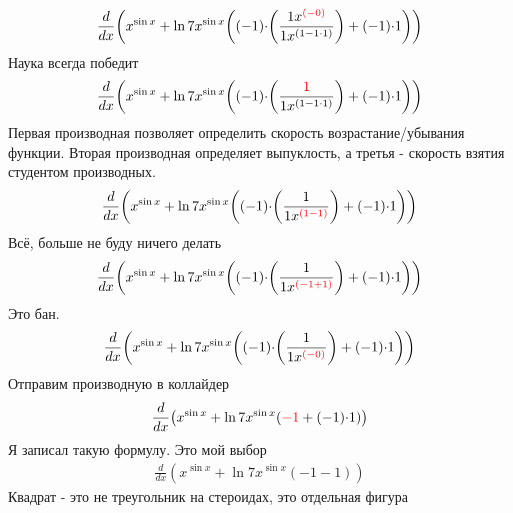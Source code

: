 \documentclass{article}
\begin{document}
\begin{center}
\begin{gather*}
{{\frac{{d}}{{d{{x}}}}}{{\left({{x}^{\sin{{x}}}}+{{\ln{{7}}}{{{x}^{\sin{{x}}}}{\left({{\left(-{1}\right)}{\cdot}{\left(\frac{{{1}{{x}^{\color{red}{{\left(-{0}\right)}}}}}}{{{1}{{x}^{\left({1}-{{1}{\cdot}{1}}\right)}}}}\right)}}+{{\left(-{1}\right)}{\cdot}{1}}\right)}}}\right)}}}\end{gather*}
Наука всегда победит\begin{gather*}
{{\frac{{d}}{{d{{x}}}}}{{\left({{x}^{\sin{{x}}}}+{{\ln{{7}}}{{{x}^{\sin{{x}}}}{\left({{\left(-{1}\right)}{\cdot}{\left(\frac{{\color{red}{{1}}}}{{{1}{{x}^{\left({1}-{{1}{\cdot}{1}}\right)}}}}\right)}}+{{\left(-{1}\right)}{\cdot}{1}}\right)}}}\right)}}}\end{gather*}
Первая производная позволяет определить скорость возрастание/убывания функции. Вторая производная определяет выпуклость, а третья - скорость взятия студентом производных.\begin{gather*}
{{\frac{{d}}{{d{{x}}}}}{{\left({{x}^{\sin{{x}}}}+{{\ln{{7}}}{{{x}^{\sin{{x}}}}{\left({{\left(-{1}\right)}{\cdot}{\left(\frac{{1}}{{{1}{{x}^{\color{red}{{\left({1}-{1}\right)}}}}}}\right)}}+{{\left(-{1}\right)}{\cdot}{1}}\right)}}}\right)}}}\end{gather*}
Всё, больше не буду ничего делать\begin{gather*}
{{\frac{{d}}{{d{{x}}}}}{{\left({{x}^{\sin{{x}}}}+{{\ln{{7}}}{{{x}^{\sin{{x}}}}{\left({{\left(-{1}\right)}{\cdot}{\left(\frac{{1}}{{{1}{{x}^{\color{red}{{\left({-{1}}+{1}\right)}}}}}}\right)}}+{{\left(-{1}\right)}{\cdot}{1}}\right)}}}\right)}}}\end{gather*}
Это бан.\begin{gather*}
{{\frac{{d}}{{d{{x}}}}}{{\left({{x}^{\sin{{x}}}}+{{\ln{{7}}}{{{x}^{\sin{{x}}}}{\left({{\left(-{1}\right)}{\cdot}{\left(\frac{{1}}{{{1}{{x}^{\color{red}{{\left(-{0}\right)}}}}}}\right)}}+{{\left(-{1}\right)}{\cdot}{1}}\right)}}}\right)}}}\end{gather*}
Отправим производную в коллайдер\begin{gather*}
{{\frac{{d}}{{d{{x}}}}}{{\left({{x}^{\sin{{x}}}}+{{\ln{{7}}}{{{x}^{\sin{{x}}}}{\left({\color{red}{{-{1}}}}+{{\left(-{1}\right)}{\cdot}{1}}\right)}}}\right)}}}\end{gather*}
Я записал такую формулу. Это мой выбор\begin{gather*}
{{\frac{{d}}{{d{{x}}}}}{{\left({{x}^{\sin{{x}}}}+{{\ln{{7}}}{{{x}^{\sin{{x}}}}{\left({-{1}}-{1}\right)}}}\right)}}}\end{gather*}
Квадрат - это не треугольник на стероидах, это отдельная фигура\begin{gather*}

\end{gather*}
\end{center}
\end{document}
